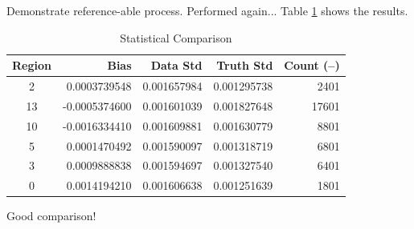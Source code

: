   \todotoday
  \stit
    \itm Demonstrate reference-able process.
  \enit
      Performed  again...
    \stit
      \itm Table \ref{tab:B1} shows the results.
      \begin{table}[H]
      \begin{center}
      {\bf \caption{Statistical Comparison} \label{tab:B1}}
      \vspace{5pt}
      \begin{tabular}{|c|r|r|r|r|} \hline
        Region        & Bias          & Data Std     & Truth Std     & Count (--) \\ \hline
        2             &  0.0003739548 & 0.001657984  & 0.001295738   &  2401      \\
        13            & -0.0005374600 & 0.001601039  & 0.001827648   & 17601      \\
        10            & -0.0016334410 & 0.001609881  & 0.001630779   &  8801      \\
        5             &  0.0001470492 & 0.001590097  & 0.001318719   &  6801      \\
        3             &  0.0009888838 & 0.001594697  & 0.001327540   &  6401      \\
        0             &  0.0014194210 & 0.001606638  & 0.001251639   &  1801      \\ \hline
      \end{tabular}
      \end{center}
      \end{table}
      \itm Good comparison!
    \enit
    
